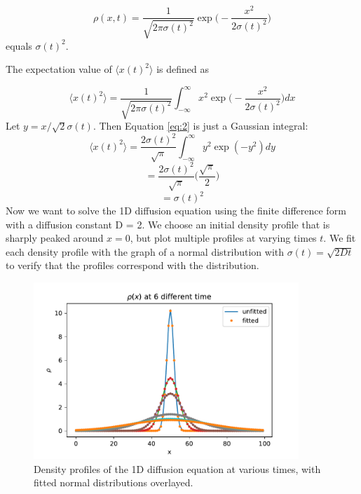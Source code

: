 \documentclass{article}
\begin{document}
\begin{equation}
\rho(x,t) = \frac{1}{\sqrt{2\pi\sigma(t)^{2}}} \exp \bigg(-\frac{x^{2}}{2\sigma(t)^{2}}\bigg)
\end{equation}
equals $\sigma(t)^{2}$.\par
\noindent The expectation value of $\langle x(t)^{2} \rangle$ is defined as

\begin{equation}
\langle x(t)^{2} \rangle = \frac{1}{\sqrt{2\pi\sigma(t)^{2}}} \int_{-\infty}^{\infty} x^{2} \exp \bigg(-\frac{x^{2}}{2\sigma(t)^{2}}\bigg) dx
\label{eq:2}
\end{equation}
Let $y = x/\sqrt{2}\sigma(t)$. Then Equation \ref{eq:2} is just a Gaussian integral:
\begin{equation}
\langle x(t)^{2} \rangle = \frac{2\sigma(t)^2}{\sqrt{\pi}} \int_{-\infty}^{\infty} y^{2} \exp(-y^{2}) dy
\end{equation}
\begin{equation}
= \frac{2\sigma(t)^2}{\sqrt{\pi}} \bigg(\frac{\sqrt{\pi}}{2}\bigg)
\end{equation}
\begin{equation}
= \sigma(t)^{2}
\end{equation}
Now we want to solve the 1D diffusion equation using the finite difference form with a diffusion constant D = 2. We choose an initial density profile that is sharply peaked around $x = 0$, but plot multiple profiles at varying times $t$. We fit each density profile with the graph of a normal distribution with $\sigma(t) = \sqrt{2Dt}$ to verify that the profiles correspond with the distribution.\par
\begin{figure}[H]
\centering
\captionsetup{justification=centering, margin=3.5cm}
\includegraphics[width=10cm]{snapshots.pdf}
\caption{Density profiles of the 1D diffusion equation at various times, with fitted normal distributions overlayed.}
\end{figure}
\end{document}
